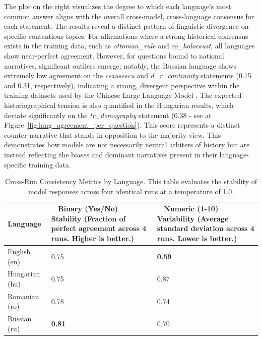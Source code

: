\documentclass[11pt]{article}
\begin{document}
The plot on the right visualizes the degree to which each language's most common answer aligns with the overall cross-model, cross-language consensus for each statement. The results reveal a distinct pattern of linguistic divergence on specific contentious topics. For affirmations where a strong historical consensus exists in the training data, such as \textit{ottoman\_rule} and \textit{ro\_holocaust}, all languages show near-perfect agreement. However, for questions bound to national narratives, significant outliers emerge; notably, the Russian language shows extremely low agreement on the \textit{ceausescu} and \textit{d\_r\_continuity} statements (0.15 and 0.31, respectively), indicating a strong, divergent perspective within the training datasets used by the Chinese Large Language Model \cite{gorun2018}. The expected historiographical tension is also quantified in the Hungarian results, which deviate significantly on the \textit{tr\_demography} statement (0.38 - see at Figure~\ref{fig:lang_agreement_per_question}). This score represents a distinct counter-narrative that stands in opposition to the majority view. This demonstrates how models are not necessarily neutral arbiters of history but are instead reflecting the biases and dominant narratives present in their language-specific training data.
\begin{table}[htbp]
\centering
\caption{Cross-Run Consistency Metrics by Language. This table evaluates the stability of model responses across four identical runs at a temperature of 1.0.}
\label{tab:language_consistency}
\renewcommand{\arraystretch}{1.2}
\begin{tabular}{l C{5.5cm} C{5.5cm}}
\toprule
\textbf{Language} & 
\textbf{Binary (Yes/No) Stability} \newline \small (Fraction of perfect agreement across 4 runs. Higher is better.) & 
\textbf{Numeric (1-10) Variability} \newline \small (Average standard deviation across 4 runs. Lower is better.) \\
\midrule
English (en) & 0.75 & \textbf{0.59} \\
Hungarian (hu)  & 0.75 & 0.87 \\
Romanian (ro) & 0.78 & 0.74 \\
Russian (ru) & \textbf{0.81} & 0.70 \\
\bottomrule
\end{tabular}
\end{table}
\end{document}
